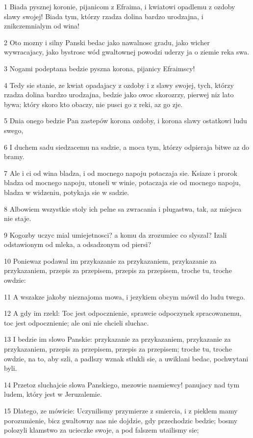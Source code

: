 \par 1 Biada pysznej koronie, pijanicom z Efraima, i kwiatowi opadlemu z ozdoby slawy swojej! Biada tym, którzy rzadza dolina bardzo urodzajna, i znikczemnialym od wina!
\par 2 Oto mozny i silny Panski bedac jako nawalnosc gradu, jako wicher wywracajacy, jako bystrosc wód gwaltownej powodzi uderzy ja o ziemie reka swa.
\par 3 Nogami podeptana bedzie pyszna korona, pijanicy Efraimscy!
\par 4 Tedy sie stanie, ze kwiat opadajacy z ozdoby i z slawy swojej, tych, którzy rzadza dolina bardzo urodzajna, bedzie jako owoc skorozrzy, pierwej niz lato bywa; który skoro kto obaczy, nie pusci go z reki, az go zje.
\par 5 Dnia onego bedzie Pan zastepów korona ozdoby, i korona slawy ostatkowi ludu swego,
\par 6 I duchem sadu siedzacemu na sadzie, a moca tym, którzy odpieraja bitwe az do bramy.
\par 7 Ale i ci od wina bladza, i od mocnego napoju potaczaja sie. Ksiaze i prorok bladza od mocnego napoju, utoneli w winie, potaczaja sie od mocnego napoju, bladza w widzeniu, potykaja sie w sadzie.
\par 8 Albowiem wszystkie stoly ich pelne sa zwracania i plugastwa, tak, az miejsca nie staje.
\par 9 Kogozby uczyc mial umiejetnosci? a komu da zrozumiec co slyszal? Izali odstawionym od mleka, a odsadzonym od piersi?
\par 10 Poniewaz podawal im przykazanie za przykazaniem, przykazanie za przykazaniem, przepis za przepisem, przepis za przepisem, troche tu, troche owdzie:
\par 11 A wszakze jakoby nieznajoma mowa, i jezykiem obcym mówil do ludu twego.
\par 12 A gdy im rzekl: Toc jest odpocznienie, sprawcie odpoczynek spracowanemu, toc jest odpocznienie; ale oni nie chcieli sluchac.
\par 13 I bedzie im slowo Panskie: przykazanie za przykazaniem, przykazanie za przykazaniem, przepis za przepisem, przepis za przepisem; troche tu, troche owdzie, na to, aby szli, a padlszy wznak stlukli sie, a uwiklani bedac, pochwytani byli.
\par 14 Przetoz sluchajcie slowa Panskiego, mezowie nasmiewcy! panujacy nad tym ludem, który jest w Jeruzalemie.
\par 15 Dlatego, ze mówicie: Uczynilismy przymierze z smiercia, i z pieklem mamy porozumienie, bicz gwaltowny nas nie dojdzie, gdy przechodzic bedzie; bosmy polozyli klamstwo za ucieczke swoje, a pod falszem utailismy sie;
